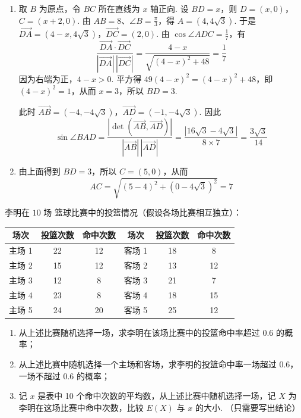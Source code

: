 \begin{solution}
\begin{enumerate}
\item 取 \(B\) 为原点，令 \(BC\) 所在直线为 \(x\) 轴正向. 设 \(BD=x\)，则
\(D=(x,0)\)，\(C=(x+2,0)\). 由 \(AB=8\)、\(\angle B=\frac{\pi}{3}\)，得
\(A=(4,4\sqrt3)\). 于是
\(\overrightarrow{DA}=(4-x,4\sqrt3)\)，\(\overrightarrow{DC}=(2,0)\).
由 \(\cos\angle ADC=\frac17\)，有
\[
\frac{\overrightarrow{DA}\cdot\overrightarrow{DC}}
{|\overrightarrow{DA}|\,|\overrightarrow{DC}|}
=\frac{4-x}{\sqrt{(4-x)^2+48}}=\frac17
\]
因为右端为正，\(4-x>0\). 平方得 \(49(4-x)^2=(4-x)^2+48\)，即
\((4-x)^2=1\)，从而 \(x=3\)，所以 \(BD=3\).

此时
\(\overrightarrow{AB}=(-4,-4\sqrt3)\)，\(\overrightarrow{AD}=(-1,-4\sqrt3)\).
因此
\[
\sin\angle BAD
=\frac{|\det(\overrightarrow{AB},\overrightarrow{AD})|}
{|\overrightarrow{AB}|\,|\overrightarrow{AD}|}
=\frac{|16\sqrt3-4\sqrt3|}{8\times7}
=\frac{3\sqrt3}{14}
\]
\item 由上面得到 \(BD=3\)，所以 \(C=(5,0)\)，从而
\[
AC=\sqrt{(5-4)^2+(0-4\sqrt3)^2}=7
\]
\end{enumerate}
\end{solution}

\begin{problem}
李明在 \(10\text{ 场}\) 篮球比赛中的投篮情况（假设各场比赛相互独立）：

\begin{center}
\begin{tabular}{c|c|c|c|c|c}
\hline
场次 & 投篮次数 & 命中次数 & 场次 & 投篮次数 & 命中次数 \\
\hline
主场 1 & 22 & 12 & 客场 1 & 18 & 8 \\
主场 2 & 15 & 12 & 客场 2 & 13 & 12 \\
主场 3 & 12 & 8 & 客场 3 & 21 & 7 \\
主场 4 & 23 & 8 & 客场 4 & 18 & 15 \\
主场 5 & 24 & 20 & 客场 5 & 25 & 12 \\
\hline
\end{tabular}
\end{center}

\begin{enumerate}
\item 从上述比赛随机选择一场，求李明在该场比赛中的投篮命中率超过 0.6 的概率；
\item 从上述比赛中随机选择一个主场和客场，求李明的投篮命中率一场超过 0.6，一场不超过 0.6 的概率；
\item 记 \(x\) 是表中 10 个命中次数的平均数，从上述比赛中随机选择一场，记 \(X\) 为李明在这场比赛中命中次数，比较 \(E(X)\) 与 \(x\) 的大小. （只需要写出结论）
\end{enumerate}
\end{problem}

